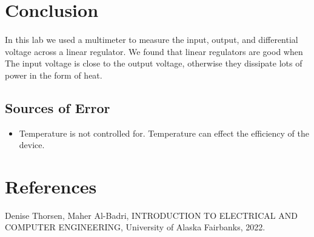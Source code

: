 \documentclass{article}
\begin{document}
\newpage
\section{Conclusion}
\paragraph{}
In this lab we used a multimeter to measure the input, output, and differential voltage across a linear regulator. We found that linear regulators are good when The input voltage is close to the output voltage, otherwise they dissipate lots of power in the form of heat.

\subsection{Sources of Error}

\begin{itemize}
	\item Temperature is not controlled for. Temperature can effect the efficiency of the device.
\end{itemize}


\newpage
\section{References}
\noindent
[1] Denise Thorsen, Maher Al-Badri, INTRODUCTION TO ELECTRICAL AND COMPUTER ENGINEERING, University of Alaska Fairbanks, 2022.
\newline
\newline
\noindent
\end{document}
